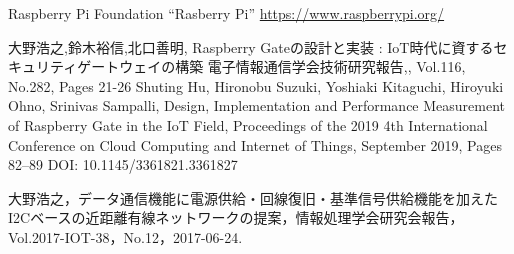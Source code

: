 {\begin{acknowledgment}
\end{acknowledgment}




\begin{thebibliography}{2}

  Raspberry Pi Foundation ``Rasberry Pi''
  \url{https://www.raspberrypi.org/}



大野浩之,鈴木裕信,北口善明,
Raspberry Gateの設計と実装 : IoT時代に資するセキュリティゲートウェイの構築
電子情報通信学会技術研究報告,,
Vol.116, No.282, Pages 21-26
Shuting Hu, Hironobu Suzuki, Yoshiaki Kitaguchi, Hiroyuki Ohno, Srinivas Sampalli,
Design, Implementation and Performance Measurement of Raspberry Gate in the IoT Field,
Proceedings of the 2019 4th International Conference on Cloud Computing and Internet of Things, September 2019, Pages 82–89
DOI: 10.1145/3361821.3361827

  大野浩之，データ通信機能に電源供給・回線復旧・基準信号供給機能を加えたI2Cベースの近距離有線ネットワークの提案，情報処理学会研究会報告，Vol.2017-IOT-38，No.12，2017-06-24.


\end{thebibliography}}
